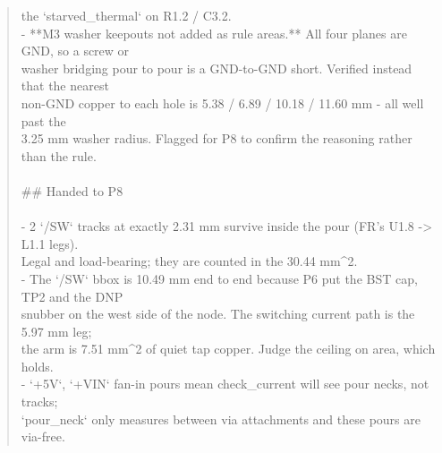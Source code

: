 \documentclass[11pt,a4paper]{article}
\begin{document}
\begin{quote}
  the `starved\_thermal` on R1.2 / C3.2.\\
- {*}{*}M3 washer keepouts not added as rule areas.{*}{*} All four planes are GND, so a screw or\\
  washer bridging pour to pour is a GND-to-GND short. Verified instead that the nearest\\
  non-GND copper to each hole is 5.38 / 6.89 / 10.18 / 11.60 mm - all well past the\\
  3.25 mm washer radius. Flagged for P8 to confirm the reasoning rather than the rule.\\
~\\
\#\# Handed to P8\\
~\\
- 2 `/SW` tracks at exactly 2.31 mm survive inside the pour (FR's U1.8 -\textgreater{} L1.1 legs).\\
  Legal and load-bearing; they are counted in the 30.44 mm\textasciicircum{}2.\\
- The `/SW` bbox is 10.49 mm end to end because P6 put the BST cap, TP2 and the DNP\\
  snubber on the west side of the node. The switching current path is the 5.97 mm leg;\\
  the arm is 7.51 mm\textasciicircum{}2 of quiet tap copper. Judge the ceiling on area, which holds.\\
- `+5V`, `+VIN` fan-in pours mean check\_current will see pour necks, not tracks;\\
  `pour\_neck` only measures between via attachments and these pours are via-free.
\end{quote}
\end{document}
